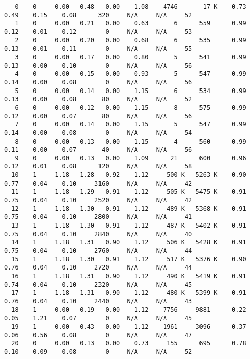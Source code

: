 \begin{lstlisting}
   0    0     0.00   0.48   0.00    1.08    4746       17 K    0.73    0.49    0.15    0.08      320     N/A     N/A     52
   1    0     0.00   0.21   0.00    0.63       6      559      0.99    0.12    0.01    0.12        0     N/A     N/A     53
   2    0     0.00   0.20   0.00    0.68       6      535      0.99    0.13    0.01    0.11        0     N/A     N/A     55
   3    0     0.00   0.17   0.00    0.80       5      541      0.99    0.13    0.00    0.10        0     N/A     N/A     56
   4    0     0.00   0.15   0.00    0.93       5      547      0.99    0.14    0.00    0.08        0     N/A     N/A     56
   5    0     0.00   0.14   0.00    1.15       6      534      0.99    0.13    0.00    0.08       80     N/A     N/A     52
   6    0     0.00   0.12   0.00    1.15       8      575      0.99    0.12    0.00    0.07       80     N/A     N/A     56
   7    0     0.00   0.14   0.00    1.15       5      547      0.99    0.14    0.00    0.08        0     N/A     N/A     54
   8    0     0.00   0.13   0.00    1.15       4      560      0.99    0.11    0.00    0.07       40     N/A     N/A     56
   9    0     0.00   0.13   0.00    1.09      21      600      0.96    0.12    0.01    0.08      120     N/A     N/A     58
  10    1     1.18   1.28   0.92    1.12     500 K   5263 K    0.90    0.77    0.04    0.10     3160     N/A     N/A     42
  11    1     1.18   1.29   0.91    1.12     505 K   5475 K    0.91    0.75    0.04    0.10     2520     N/A     N/A     42
  12    1     1.18   1.30   0.91    1.12     489 K   5368 K    0.91    0.75    0.04    0.10     2800     N/A     N/A     41
  13    1     1.18   1.30   0.91    1.12     487 K   5402 K    0.91    0.75    0.04    0.10     2840     N/A     N/A     40
  14    1     1.18   1.31   0.90    1.12     506 K   5428 K    0.91    0.75    0.04    0.10     2760     N/A     N/A     44
  15    1     1.18   1.30   0.91    1.12     517 K   5376 K    0.90    0.76    0.04    0.10     2720     N/A     N/A     44
  16    1     1.18   1.31   0.90    1.12     490 K   5419 K    0.91    0.74    0.04    0.10     2320     N/A     N/A     45
  17    1     1.18   1.31   0.90    1.12     480 K   5399 K    0.91    0.76    0.04    0.10     2440     N/A     N/A     43
  18    1     0.00   0.19   0.00    1.12    7756     9881      0.22    0.05    1.21    0.07        0     N/A     N/A     45
  19    1     0.00   0.43   0.00    1.12    1961     3096      0.37    0.06    0.56    0.08        0     N/A     N/A     47
  20    0     0.00   0.13   0.00    0.73     155      695      0.78    0.10    0.09    0.08        0     N/A     N/A     52

\end{lstlisting}
